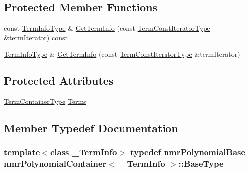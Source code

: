 \subsection*{Protected Member Functions}
\begin{DoxyCompactItemize}
\item 
const \hyperlink{classnmr_polynomial_container_acc456652a77699f540082b3f285ac460}{Term\+Info\+Type} \& \hyperlink{classnmr_polynomial_container_a9c29b5a6752e6aa94975a230e4ac6948}{Get\+Term\+Info} (const \hyperlink{classnmr_polynomial_container_aba8d31506ab6a487fdc4fe2815469442}{Term\+Const\+Iterator\+Type} \&term\+Iterator) const 
\item 
\hyperlink{classnmr_polynomial_container_acc456652a77699f540082b3f285ac460}{Term\+Info\+Type} \& \hyperlink{classnmr_polynomial_container_a0f2ab228be1631eccf5b23122308289e}{Get\+Term\+Info} (const \hyperlink{classnmr_polynomial_container_aba8d31506ab6a487fdc4fe2815469442}{Term\+Const\+Iterator\+Type} \&term\+Iterator)
\end{DoxyCompactItemize}
\subsection*{Protected Attributes}
\begin{DoxyCompactItemize}
\item 
\hyperlink{classnmr_polynomial_container_ae9ba96ffe1b50f1cd84e6728c3a77128}{Term\+Container\+Type} \hyperlink{classnmr_polynomial_container_a70c5e0c98f3a13222bb51bf855e6988a}{Terms}
\end{DoxyCompactItemize}


\subsection{Member Typedef Documentation}
\hypertarget{classnmr_polynomial_container_afcdfc28d7e6ba39198175c7a2cc5ed7d}{}
\subsubsection[{Base\+Type}]{\setlength{\rightskip}{0pt plus 5cm}template$<$class \+\_\+\+Term\+Info$>$ typedef {\bf nmr\+Polynomial\+Base} {\bf nmr\+Polynomial\+Container}$<$ \+\_\+\+Term\+Info $>$\+::{\bf Base\+Type}}\label{classnmr_polynomial_container_afcdfc28d7e6ba39198175c7a2cc5ed7d}
\hypertarget{classnmr_polynomial_container_ae9c399b9034fb32315a644ebb103b4dd}{}
